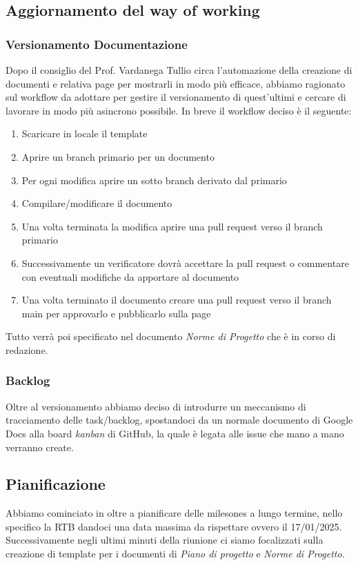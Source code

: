 \subsection{Aggiornamento del way of working}
\subsubsection{Versionamento Documentazione}
Dopo il consiglio del Prof. Vardanega Tullio circa l'automazione della creazione di documenti e relativa page per mostrarli in modo più efficace, abbiamo ragionato 
sul workflow da adottare per gestire il versionamento di quest'ultimi e cercare di lavorare in modo più asincrono possibile.
In breve il workflow deciso è il seguente:
\begin{enumerate}
    \item Scaricare in locale il template
    \item Aprire un branch primario per un documento
    \item Per ogni modifica aprire un sotto branch derivato dal primario
    \item Compilare/modificare il documento
    \item Una volta terminata la modifica aprire una pull request verso il branch primario
    \item Successivamente un verificatore dovrà accettare la pull request o commentare con eventuali modifiche da apportare al documento
    \item Una volta terminato il documento creare una pull request verso il branch main per approvarlo e pubblicarlo sulla page
\end{enumerate}
Tutto verrà poi specificato nel documento \textit{Norme di Progetto} che è in corso di redazione.
\subsubsection{Backlog}
Oltre al versionamento abbiamo deciso di introdurre un meccanismo di tracciamento delle task/backlog, spostandoci da un normale documento di Google Docs alla board \textit{kanban} di GitHub, la quale è legata
alle issue che mano a mano verranno create.

\subsection{Pianificazione}
Abbiamo cominciato in oltre a pianificare delle milesones a lungo termine, nello specifico la RTB dandoci una data massima da rispettare ovvero il 17/01/2025. Successivamente negli ultimi minuti della riunione
ci siamo focalizzati sulla creazione di template per i documenti di \textit{Piano di progetto} e \textit{Norme di Progetto}.

